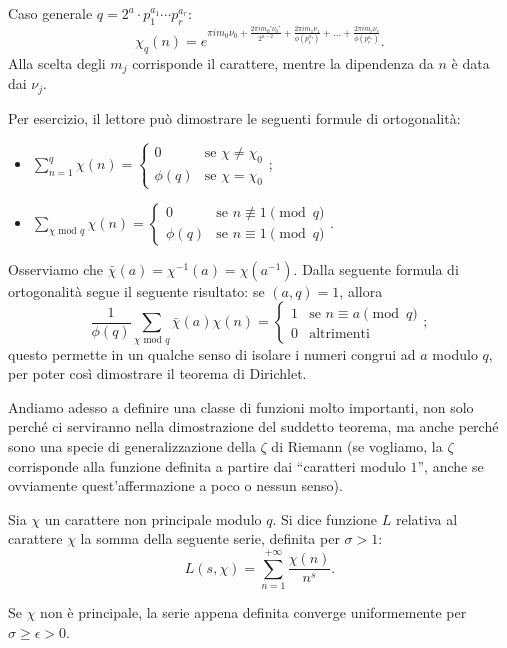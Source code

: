 Caso generale $q=2^a\cdot p_1^{a_1}\cdots p_r^{a_r}$:
$$\chi_q(n)=e^{\pi im_0\nu_0+\frac{2\pi im_0'\nu_0'}{2^{a-2}}+\frac{2\pi im_1\nu_1}{\phi(p_1^{a_1})}+\dots+\frac{2\pi im_r\nu_r}{\phi(p_r^{a_r})}}.$$
Alla scelta degli $m_j$ corrisponde il carattere, mentre la dipendenza da $n$ è data dai $\nu_j$.

Per esercizio, il lettore può dimostrare le seguenti formule di ortogonalità:
\begin{itemize}
  \item $\displaystyle \sum_{n=1}^q \chi(n)=\begin{cases}
    0 &\mbox{se }\chi\not=\chi_0 \\
    \phi(q) &\mbox{se }\chi=\chi_0
  \end{cases}$;
  \item $\displaystyle \sum_{\chi\text{ mod }q} \chi(n)=\begin{cases}
    0 &\mbox{se }n\not\equiv 1\pmod{q} \\
    \phi(q) &\mbox{se }n\equiv 1\pmod{q}
  \end{cases}$.
\end{itemize}
Osserviamo che $\bar{\chi}(a)=\chi^{-1}(a)=\chi(a^{-1})$. Dalla seguente formula di ortogonalità segue il seguente risultato: se $(a,q)=1$, allora
$$\frac{1}{\phi(q)}\sum_{\chi\text{ mod }q}\bar{\chi}(a)\chi(n)=\begin{cases}
  1 &\mbox{se }n\equiv a \pmod{q} \\
  0 &\mbox{altrimenti}
\end{cases};$$
questo permette in un qualche senso di isolare i numeri congrui ad $a$ modulo $q$, per poter così dimostrare il teorema di Dirichlet.

Andiamo adesso a definire una classe di funzioni molto importanti, non solo perché ci serviranno nella dimostrazione del suddetto teorema, ma anche perché sono una specie di generalizzazione della $\zeta$ di Riemann (se vogliamo, la $\zeta$ corrisponde alla funzione definita a partire dai ``caratteri modulo $1$'', anche se ovviamente quest'affermazione a poco o nessun senso).

\begin{defn}
  Sia $\chi$ un carattere non principale modulo $q$. Si dice funzione $L$ relativa al carattere $\chi$ la somma della seguente serie, definita per $\sigma>1$:
  $$L(s,\chi)=\sum_{n=1}^{+\infty} \frac{\chi(n)}{n^s}.$$
\end{defn}

\begin{prop}
  Se $\chi$ non è principale, la serie appena definita converge uniformemente per $\sigma \ge \epsilon>0$.
\end{prop}

